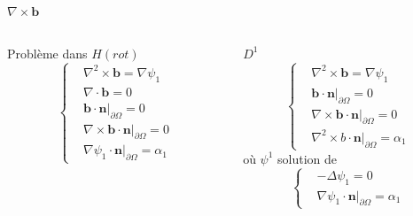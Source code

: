 \documentclass{beamer}
\newcommand{\grad}{{\nabla}}
\newcommand{\laplace}{{\Delta}}
\newcommand{\rot}{{\nabla\times}}
\newcommand{\rott}{{\nabla^2\times}}
\renewcommand{\div}{{\nabla\cdot}}
\newcommand{\restr}{{\big\rvert_{\partial\Omega}}}
\begin{document}
\begin{frame}{$\rot \mathbf{b}$}
\begin{columns}[t]
\begin{column}{5cm}
\begin{block}{Problème dans $ H(rot)$}
\[\left\{
\begin{aligned}
&\rott \mathbf{b} = \grad\psi_1\\
&\div \mathbf{b} = 0\\
&\mathbf{b}\cdot \mathbf{n}\restr = 0\\
&\rot \mathbf{b}\cdot \mathbf{n}\restr = 0\\
&\grad\psi_1\cdot \mathbf{n}\restr = \alpha_1
\end{aligned}
\right.\]
\end{block}
\end{column}
\begin{column}{5cm}
\begin{block}{$ D^1$}
\[\left\{
\begin{aligned}
&\rott \mathbf{b} = \grad\psi_1\\
&\mathbf{b}\cdot \mathbf{n}\restr = 0\\
&\rot \mathbf{b}\cdot \mathbf{n}\restr = 0\\
&\rott b\cdot \mathbf{n}\restr = \alpha_1
\end{aligned}
\right.\]
où $\psi^1$ solution de
\[\left\{
\begin{aligned}
&-\laplace\psi_1 = 0\\
&\grad\psi_1\cdot \mathbf{n}\restr=\alpha_1
\end{aligned}
\right.\]
\end{block}
\end{column}
\end{columns}
\end{frame}
\end{document}

